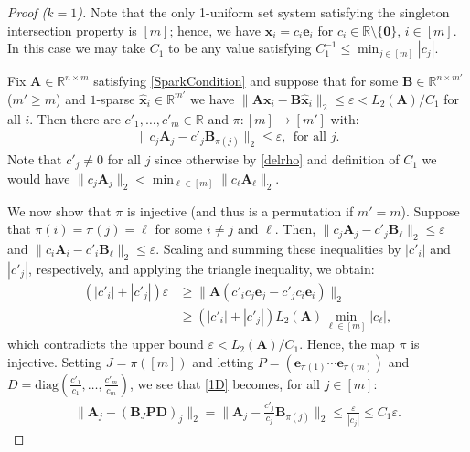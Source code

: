 \documentclass[9pt,twocolumn]{pnas-new}
\begin{document}
\begin{proof}[Proof ($k=1$)]
Note that the only 1-uniform set system satisfying the singleton intersection property is $[m]$; hence, we have $\mathbf{x}_i = c_i \mathbf{e}_i$ for $c_i \in \mathbb{R} \setminus \{\mathbf{0}\}$, $i \in [m]$. In this case we may take $C_1$ to be any value satisfying $C_1^{-1} \leq \min_{j \in [m]} |c_{j}|$. 

Fix $\mathbf{A} \in \mathbb{R}^{n \times m}$ satisfying \eqref{SparkCondition} and suppose that for some $\mathbf{B} \in \mathbb{R}^{n \times m'}$ ($m' \geq m$) and $1$-sparse $\mathbf{\hat x}_i \in \mathbb{R}^{m'}$ we have  $\|\mathbf{A}\mathbf{x}_i - \mathbf{B}\mathbf{\hat x}_i\|_2 \leq \varepsilon < L_2(\mathbf{A}) / C_1$ for all $i$. Then there are $c'_1, \ldots, c'_m \in \mathbb{R}$ and $\pi: [m] \to [m']$ with:
\begin{align}\label{1D}
\|c_j\mathbf{A}_j - c'_j\mathbf{B}_{\pi(j)}\|_2 \leq \varepsilon, \ \ \text{for all $j$}.
\end{align} 
Note that $c'_j \neq 0$ for all $j$ since otherwise by \eqref{delrho} and definition of $C_1$ we would have $\|c_j\mathbf{A}_j\|_2 < \min_{\ell \in [m]}\|c_{\ell}\mathbf{A}_{\ell}\|_2$. 

We  now show that $\pi$ is injective (and thus is a permutation if $m' = m$). Suppose that $\pi(i) = \pi(j) = \ell$ for some $i \neq j$ and $\ell$. Then, $\|c_{j}\mathbf{A}_{j} - c'_{j}\mathbf{B}_{\ell}\|_2 \leq \varepsilon$ and $\|c_{i}\mathbf{A}_{i} - c'_{i} \mathbf{B}_{\ell}\|_2  \leq \varepsilon$. Scaling and summing these inequalities by $|c'_{i}|$ and $|c'_{j}|$, respectively, and applying the triangle inequality, we obtain:
\begin{align*}%
(|c'_{i}| + |c'_{j}|) \varepsilon
&\geq\|\mathbf{A}(c'_{i}c_{j} \mathbf{e}_{j} - c'_{j}c_{i}\mathbf{e}_{i})\|_2 \nonumber \\ 
&\geq  \left( |c'_{i}| + |c'_{j}| \right) L_2(\mathbf{A}) \min_{\ell \in [m]} |c_\ell |,
\end{align*}
%
which contradicts the upper bound $\varepsilon < L_2(\mathbf{A})/C_1$. Hence, the map $\pi$ is injective. Setting $J = \pi([m])$ and letting $P = \left( \mathbf{e}_{\pi(1)} \cdots \mathbf{e}_{\pi(m)}\right)$ and $D = \text{diag}(\frac{c'_1}{c_1},\ldots,\frac{c'_m}{c_m})$, we see that \eqref{1D} becomes, for all $j \in [m]$:
\begin{align*}%
\|\mathbf{A}_j - (\mathbf{B}_J\mathbf{PD})_j\|_2 
= \|\mathbf{A}_j - \frac{c'_j}{c_j}\mathbf{B}_{\pi(j)}\|_2 
\leq \frac{\varepsilon}{|c_j|} 
\leq C_1\varepsilon.
\end{align*}
\end{proof}
\end{document}
